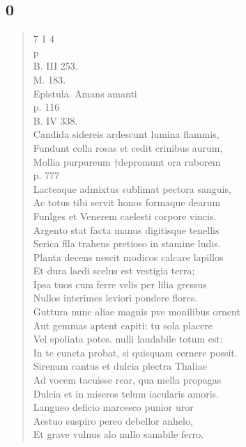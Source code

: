 \documentclass[11pt, a4paper]{report}
\begin{document}
            \subsection*{0}
      \begin{verse}
      7 1 4 \\  \lbrack  p \\ B. III 253. \\ M. 183. \\ Epistula. Amans amanti \\ p. 116 \\ B. IV 338. \\ Candida sidereis ardescunt lumina flammis, \\ Fundunt colla rosas et cedit crinibus aurum, \\ 
        ﻿\pagebreak 
    Mollia purpureum †depromunt ora ruborem \\ p. 777 \\ Lacteaque admixtus sublimat pectora sanguis, \\ Ac totus tibi servit honos formaque dearum \\ Funlges et Venerem caelesti corpore vincis. \\ Argento stat facta manus digitisque tenellis \\ Serica flla trahens pretioso in stamine ludis. \\ Planta decens nescit modicos calcare lapillos \\ Et dura laedi scelus est vestigia terra; \\ Ipsa tuos cum ferre velis per lilia gressus \\ Nullos interimes leviori pondere flores. \\ Guttura nunc aliae magnis \lbrack pve \rbrack  monilibus ornent \\ Aut gemmas aptent capiti: tu sola placere \\ Vel spoliata potes. nulli laudabile totum est: \\ In te cuncta probat, si quisquam cernere possit. \\ Sirenum cantus et dulcia plectra Thaliae \\ Ad vocem tacuisse rear, qua mella propagas \\ Dulcia et in miseros telum iacularis amoris. \\ Langueo deficio marcesco punior uror \\ Aestuo suspiro pereo debellor anhelo, \\ Et grave vulnus alo nullo sanabile ferro. \\ 

\end{verse}
\end{document}
